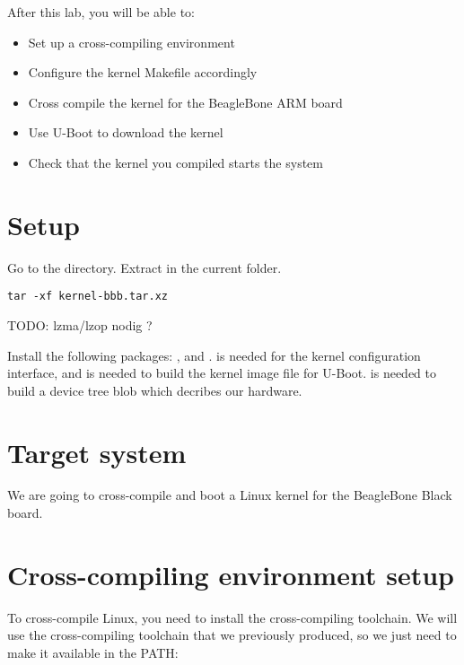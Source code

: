 
After this lab, you will be able to:
\begin{itemize}
\item Set up a cross-compiling environment
\item Configure the kernel Makefile accordingly
\item Cross compile the kernel for the BeagleBone ARM board
\item Use U-Boot to download the kernel
\item Check that the kernel you compiled starts the system
\end{itemize}

\section{Setup}

Go to the  directory.
Extract  in the current folder.

\begin{verbatim}
tar -xf kernel-bbb.tar.xz
\end{verbatim}

TODO: lzma/lzop nodig ?

Install the following packages: ,  and
.  is needed for the
 kernel configuration interface, and 
is needed to build the  kernel image file for U-Boot.
 is needed to build a device tree blob which decribes our hardware.

\section{Target system}

We are going to cross-compile and boot a Linux kernel for the BeagleBone
Black board.

\section{Cross-compiling environment setup}

To cross-compile Linux, you need to install the cross-compiling
toolchain. We will use the cross-compiling toolchain that we
previously produced, so we just need to make it available in the PATH:


